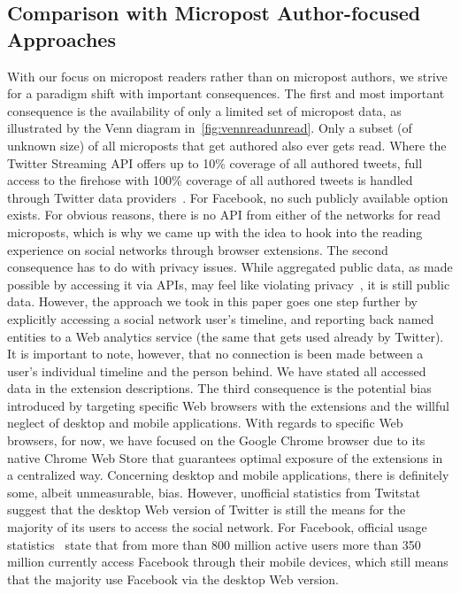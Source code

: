 \documentclass{iosart2c}
\begin{document}
\subsection{Comparison with Micropost Author-focused Approaches}
With our focus on micropost readers rather than on micropost authors, we strive for a paradigm shift with important consequences.
The first and most important consequence is the availability of only a limited set of micropost data, as illustrated by the Venn diagram in~\autoref{fig:vennreadunread}.
Only a subset (of unknown size) of all microposts that get authored also ever gets read.
Where the Twitter Streaming API offers up to 10\% coverage of all authored tweets, full access to the firehose with 100\% coverage of all authored tweets is handled through Twitter data providers~\cite{dataproviders}.
For Facebook, no such publicly available option exists.
For obvious reasons, there is no API from either of the networks for read microposts, which is why we came up with the idea to hook into the reading experience on social networks through browser extensions.
The second consequence has to do with privacy issues.
While aggregated public data, as made possible by accessing it via APIs, may feel like violating privacy~\cite{nyt}, it is still public data.
However, the approach we took in this paper goes one step further by explicitly accessing a social network user's timeline, and reporting back named entities to a Web analytics service (the same that gets used already by Twitter). 
It is important to note, however, that no connection is been made between a user's individual timeline and the person behind.
We have stated all accessed data in the extension descriptions.
The third consequence is the potential bias introduced by targeting specific Web browsers with the extensions and the willful neglect of desktop and mobile applications. 
With regards to specific Web browsers, for now, we have focused on the Google Chrome browser due to its native Chrome Web Store that guarantees optimal exposure of the extensions in a centralized way.
Concerning desktop and mobile applications, there is definitely some, albeit unmeasurable, bias.
However, unofficial statistics from Twitstat~\cite{twitstat} suggest that the desktop Web version of Twitter is still the means for the majority of its users to access the social network.
For Facebook, official usage statistics~\cite{facebookstats} state that from more than 800 million active users more than 350 million currently access Facebook through their mobile devices, which still means that the majority use Facebook via the desktop Web version.
\end{document}
